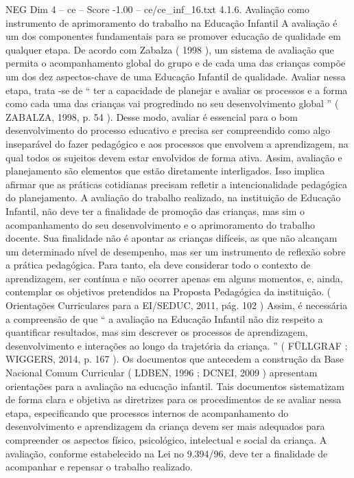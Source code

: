 \begin{textsample}{NEG Dim 4 – ce – Score -1.00 – ce/ce\_inf\_16.txt}  \label{ex:f4_neg_159}
4.1.6.
Avaliação como instrumento de aprimoramento do trabalho na Educação Infantil A avaliação é um dos componentes fundamentais para se promover educação de qualidade em qualquer etapa.
De acordo com Zabalza ( 1998 ), um sistema de avaliação que permita o acompanhamento global do grupo e de cada uma das crianças compõe um dos dez aspectos-chave de uma Educação Infantil de qualidade.
Avaliar nessa etapa, trata -se de “ ter a capacidade de planejar e avaliar os processos e a forma como cada uma das crianças vai progredindo no seu desenvolvimento global ” ( ZABALZA, 1998, p. 54 ).
Desse modo, avaliar é essencial para o bom desenvolvimento do processo educativo e precisa ser compreendido como algo inseparável do fazer pedagógico e aos processos que envolvem a aprendizagem, na qual todos os sujeitos devem estar envolvidos de forma ativa.
Assim, avaliação e planejamento são elementos que estão diretamente interligados.
Isso implica afirmar que as práticas cotidianas precisam refletir a intencionalidade pedagógica do planejamento.
A avaliação do trabalho realizado, na instituição de Educação Infantil, não deve ter a finalidade de promoção das crianças, mas sim o acompanhamento do seu desenvolvimento e o aprimoramento do trabalho docente.
Sua finalidade não é apontar as crianças difíceis, as que não alcançam um determinado nível de desempenho, mas ser um instrumento de reflexão sobre a prática pedagógica.
Para tanto, ela deve considerar todo o contexto de aprendizagem, ser contínua e não ocorrer apenas em alguns momentos, e, ainda, contemplar os objetivos pretendidos na Proposta Pedagógica da instituição. ( Orientações Curriculares para a EI/SEDUC, 2011, pág. 102 ) Assim, é necessária a compreensão de que “ a avaliação na Educação Infantil não diz respeito a quantificar resultados, mas sim descrever os processos de aprendizagem, desenvolvimento e interações ao longo da trajetória da criança. ” ( FÜLLGRAF ; WIGGERS, 2014, p. 167 ).
Os documentos que antecedem a construção da Base Nacional Comum Curricular ( LDBEN, 1996 ; DCNEI, 2009 ) apresentam orientações para a avaliação na educação infantil.
Tais documentos sistematizam de forma clara e objetiva as diretrizes para os procedimentos de se avaliar nessa etapa, especificando que processos internos de acompanhamento do desenvolvimento e aprendizagem da criança devem ser mais adequados para compreender os aspectos físico, psicológico, intelectual e social da criança.
A avaliação, conforme estabelecido na Lei no 9.394/96, deve ter a finalidade de acompanhar e repensar o trabalho realizado.

\end{textsample}
